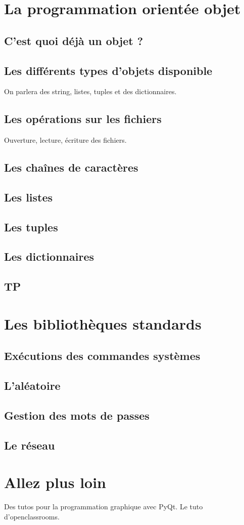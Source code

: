 \documentclass[12pt]{article}
\begin{document}
\section{La programmation orientée objet}
    \subsection{C'est quoi déjà un objet ?}
    \subsection{Les différents types d'objets disponible}
        On parlera des string, listes, tuples et des dictionnaires.
    \subsection{Les opérations sur les fichiers}
        Ouverture, lecture, écriture des fichiers.
    \subsection{Les chaînes de caractères}
    \subsection{Les listes}
    \subsection{Les tuples}
    \subsection{Les dictionnaires}
    \subsection{TP}

\section{Les bibliothèques standards}
    \subsection{Exécutions des commandes systèmes}
    \subsection{L'aléatoire}
    \subsection{Gestion des mots de passes}
    \subsection{Le réseau}

\section{Allez plus loin}
    Des tutos pour la programmation graphique avec PyQt. Le tuto d'openclassrooms.
\end{document}

